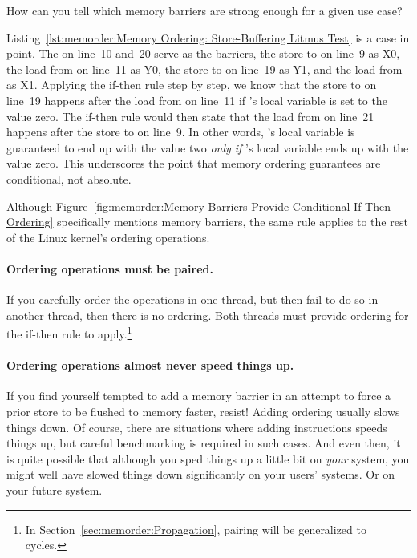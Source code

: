 \QuickQuiz{}
	How can you tell which memory barriers are strong enough for
	a given use case?
 \QuickQuizEnd

Listing~\ref{lst:memorder:Memory Ordering: Store-Buffering Litmus Test}
is a case in point.
The  on line~10 and~20 serve as the barriers,
the store to  on line~9 as X0, the load from  on line~11
as Y0, the store to  on line~19 as Y1, and the load from
 as X1.
Applying the if-then rule step by step, we know that the store to
 on line~19 happens after the load from  on line~11 if
's local variable  is set to the value zero.
The if-then rule would then state that the load from  on
line~21 happens after the store to  on line~9.
In other words,
's local variable  is guaranteed
to end up with the value two \emph{only if}
's local variable  ends up with the value zero.
This underscores the point that memory ordering guarantees are
conditional, not absolute.

Although
Figure~\ref{fig:memorder:Memory Barriers Provide Conditional If-Then Ordering}
specifically mentions memory barriers, the same rule applies to the
rest of the Linux kernel's ordering operations.

\paragraph{Ordering operations must be paired.}
If you carefully order the operations in one thread, but then fail to do
so in another thread, then there is no ordering.
Both threads must provide ordering for the if-then rule to apply.\footnote{
	In Section~\ref{sec:memorder:Propagation}, pairing will be
	generalized to cycles.}

\paragraph{Ordering operations almost never speed things up.}
If you find yourself tempted to add a memory barrier in an attempt
to force a prior store to be flushed to memory faster, resist!
Adding ordering usually slows things down.
Of course, there are situations where adding instructions speeds things
up, but careful benchmarking is required in such cases.
And even then, it is quite possible that although you sped things up
a little bit on \emph{your} system, you might well have slowed things
down significantly on your users' systems.
Or on your future system.

